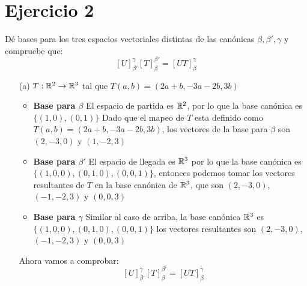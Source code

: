 \section*{Ejercicio 2}

Dé bases para los tres espacios vectoriales distintas de las canónicas $\beta, \beta', \gamma$ y compruebe que:
\begin{equation}
    \left[ U \right]_{\beta'}^{\gamma} \left[ T \right]_{\beta}^{\beta'} = \left[ UT \right]_{\beta}^{\gamma}    
\end{equation}

\begin{itemize}
    \item[(a)] $T: \mathbb{R}^{2} \rightarrow \mathbb{R}^{3}$ tal que $T(a,b) = (2a + b, -3a -2b, 3b)$
    \begin{itemize}
        \item \textbf{Base para $\beta$} El espacio de partida es $\mathbb{R}^{2}$, por lo que la base canónica es $\{ (1,0),(0,1) \}$ 
                Dado que el mapeo de $T$ esta definido como $T(a,b) = (2a + b, -3a -2b, 3b)$, los vectores de la base para $\beta$ son $(2,-3,0)$ y $(1,-2,3)$
        \item \textbf{Base para $\beta'$} El espacio de llegada es $\mathbb{R}^{3}$ por lo que la base canónica es 
                $\{ (1,0,0), (0,1,0), (0,0,1) \}$, entonces podemos tomar los vectores resultantes de $T$ en la base canónica de $\mathbb{R}^{3}$, que son $(2,-3,0)$, 
                $(-1,-2,3)$ y $(0,0,3)$
        \item \textbf{Base para $\gamma$} Similar al caso de arriba, la base canónica $\mathbb{R}^{3}$ es $\{ (1,0,0), (0,1,0), (0,0,1) \}$ los vectores resultantes
                son $(2,-3,0)$, $(-1,-2,3)$ y $(0,0,3)$
    \end{itemize}
    
    Ahora vamos a comprobar:
    \begin{equation*}
        \left[ U \right]_{\beta'}^{\gamma} \left[ T \right]_{\beta}^{\beta'} = \left[ UT \right]_{\beta}^{\gamma}    
    \end{equation*}    
    

\end{itemize}
